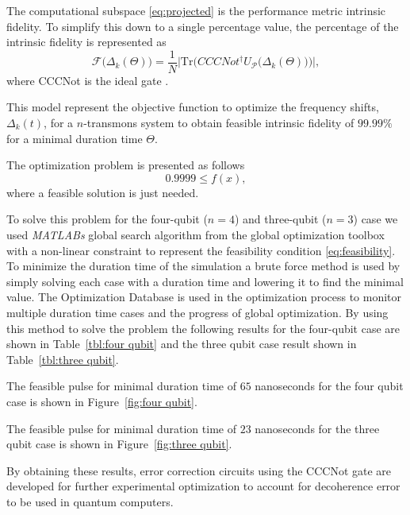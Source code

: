 The computational subspace \eqref{eq:projected} is the performance metric intrinsic fidelity. To simplify this down to a single percentage value, the percentage of the intrinsic fidelity is represented as 
\begin{equation}
    \mathscr{F}\big(\Delta_k(\Theta)\big)=\frac{1}{N}\Bigg| \mathrm{Tr}\bigg( CCCNot^{\dagger} U_\mathscr{P}\big(\Delta_k(\Theta) \big) \bigg) \Bigg|,
\end{equation}
where CCCNot is the ideal gate \cite{}. 

This model represent the objective function to optimize the frequency shifts, $\Delta_k(t)$, for a $n$-transmons system to obtain feasible intrinsic fidelity of $99.99\%$ for a minimal duration time $\Theta$.

The optimization problem is presented as follows
\begin{equation}
    \label{eq:feasibility}
    0.9999 \leq f(x),
\end{equation}
where a feasible solution is just needed. 

To solve this problem for the four-qubit ($n=4$) and three-qubit ($n=3$) case we used \textit{MATLABs} global search algorithm from the global optimization toolbox with a non-linear constraint to represent the feasibility condition \eqref{eq:feasibility}. To minimize the duration time of the simulation a brute force method is used by simply solving each case with a duration time and lowering it to find the minimal value. The Optimization Database is used in the optimization process to
monitor multiple duration time cases and the progress of global optimization. By using this method to solve the problem the following results for the four-qubit case are shown in Table~\ref{tbl:four qubit} and the three qubit case result shown in Table~\ref{tbl:three qubit}. 



The feasible pulse for minimal duration time of $65$ nanoseconds for the four qubit case is shown in Figure~\ref{fig:four qubit}.


The feasible pulse for minimal duration time of $23$ nanoseconds for the three qubit case is shown in Figure~\ref{fig:three qubit}.


By obtaining these results, error correction circuits using the CCCNot gate are developed for further experimental optimization to account for decoherence error to be used in quantum computers.
